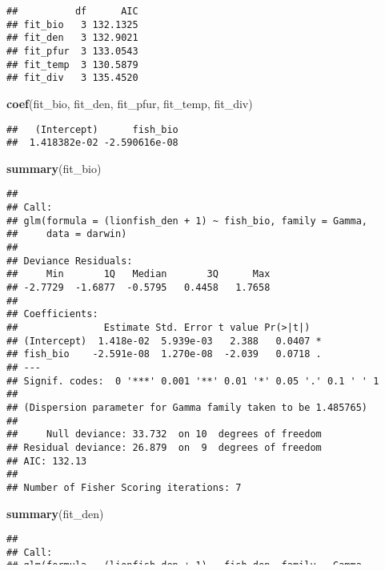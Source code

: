 \documentclass[]{article}
\newenvironment{Shaded}{\begin{snugshade}}{\end{snugshade}}
\newcommand{\KeywordTok}[1]{\textcolor[rgb]{0.13,0.29,0.53}{\textbf{#1}}}
\newcommand{\NormalTok}[1]{#1}
\begin{document}
\begin{verbatim}
##          df      AIC
## fit_bio   3 132.1325
## fit_den   3 132.9021
## fit_pfur  3 133.0543
## fit_temp  3 130.5879
## fit_div   3 135.4520
\end{verbatim}

\begin{Shaded}
\begin{Highlighting}[]
\KeywordTok{coef}\NormalTok{(fit_bio, fit_den, fit_pfur, fit_temp, fit_div)}
\end{Highlighting}
\end{Shaded}

\begin{verbatim}
##   (Intercept)      fish_bio 
##  1.418382e-02 -2.590616e-08
\end{verbatim}

\begin{Shaded}
\begin{Highlighting}[]
\KeywordTok{summary}\NormalTok{(fit_bio)}
\end{Highlighting}
\end{Shaded}

\begin{verbatim}
## 
## Call:
## glm(formula = (lionfish_den + 1) ~ fish_bio, family = Gamma, 
##     data = darwin)
## 
## Deviance Residuals: 
##     Min       1Q   Median       3Q      Max  
## -2.7729  -1.6877  -0.5795   0.4458   1.7658  
## 
## Coefficients:
##               Estimate Std. Error t value Pr(>|t|)  
## (Intercept)  1.418e-02  5.939e-03   2.388   0.0407 *
## fish_bio    -2.591e-08  1.270e-08  -2.039   0.0718 .
## ---
## Signif. codes:  0 '***' 0.001 '**' 0.01 '*' 0.05 '.' 0.1 ' ' 1
## 
## (Dispersion parameter for Gamma family taken to be 1.485765)
## 
##     Null deviance: 33.732  on 10  degrees of freedom
## Residual deviance: 26.879  on  9  degrees of freedom
## AIC: 132.13
## 
## Number of Fisher Scoring iterations: 7
\end{verbatim}

\begin{Shaded}
\begin{Highlighting}[]
\KeywordTok{summary}\NormalTok{(fit_den)}
\end{Highlighting}
\end{Shaded}

\begin{verbatim}
## 
## Call:
## glm(formula = (lionfish_den + 1) ~ fish_den, family = Gamma, 
##     data = darwin)
## 
## Deviance Residuals: 
##     Min       1Q   Median       3Q      Max  
## -2.7576  -1.8288  -0.7249   0.3836   1.6406  
## 
## Coefficients:
##               Estimate Std. Error t value Pr(>|t|)  
## (Intercept)  1.144e-02  4.857e-03   2.355   0.0430 *
## fish_den    -1.024e-06  5.547e-07  -1.845   0.0981 .
## ---
## Signif. codes:  0 '***' 0.001 '**' 0.01 '*' 0.05 '.' 0.1 ' ' 1
## 
## (Dispersion parameter for Gamma family taken to be 1.50623)
## 
##     Null deviance: 33.732  on 10  degrees of freedom
## Residual deviance: 28.346  on  9  degrees of freedom
## AIC: 132.9
## 
## Number of Fisher Scoring iterations: 7
\end{verbatim}
\end{document}
